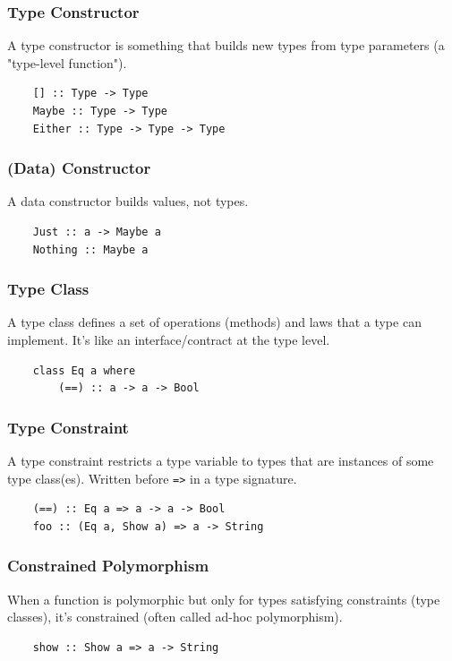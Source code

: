 \documentclass[12pt,oneside,a4paper]{article}
\begin{document}
\subsubsection*{Type Constructor}
A type constructor is something that builds new types from type parameters (a "type-level function").
\begin{lstlisting}
    [] :: Type -> Type
    Maybe :: Type -> Type
    Either :: Type -> Type -> Type
\end{lstlisting}
\subsubsection*{(Data) Constructor}
A data constructor builds values, not types.
\begin{lstlisting}
    Just :: a -> Maybe a
    Nothing :: Maybe a
\end{lstlisting}
\subsubsection*{Type Class}
A type class defines a set of operations (methods) and laws that a type can implement. It’s like an interface/contract at the type level.
\begin{lstlisting}
    class Eq a where
        (==) :: a -> a -> Bool
\end{lstlisting}
\subsubsection*{Type Constraint}
A type constraint restricts a type variable to types that are instances of some type class(es). Written before \texttt{=>} in a type signature.
\begin{lstlisting}
    (==) :: Eq a => a -> a -> Bool
    foo :: (Eq a, Show a) => a -> String
\end{lstlisting}
\subsubsection*{Constrained Polymorphism}
When a function is polymorphic but only for types satisfying constraints (type classes), it’s constrained (often called ad-hoc polymorphism).
\begin{lstlisting}
    show :: Show a => a -> String
\end{lstlisting}
\end{document}
